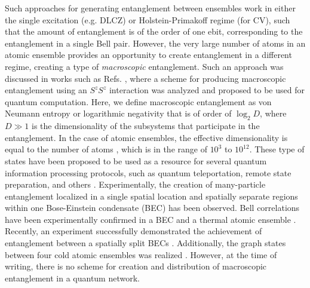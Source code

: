 \documentclass{WileyMSP-template}
\begin{document}
Such approaches for generating entanglement between ensembles work in either the single excitation  (e.g.  DLCZ) or Holstein-Primakoff regime (for CV), such that the amount of entanglement is of the order of one ebit, corresponding to the entanglement in a single Bell pair.  However, the very large number of atoms in an atomic ensemble provides an opportunity to create entanglement in a different regime, creating a type of {\it macroscopic} entanglement.
Such an approach was discussed in works such as Refs. \cite{byrnes2013fractality,pyrkov2013entanglement,rosseau2014,byrnes2012macroscopic,hussain2014geometric}, where a scheme for producing macroscopic entanglement using an $ S^z S^z$ interaction was analyzed and proposed to be used for quantum computation. Here, we define macroscopic entanglement as von Neumann entropy or logarithmic negativity that is of order of $ \log_2 D $, where $ D \gg 1  $ is the dimensionality of the subsystems that participate in the entanglement.  In the case of atomic ensembles, the effective dimensionality is equal to the number of atoms \cite{byrnes2020quantum}, which is in the range of $ 10^3 $ to $ 10^{12} $.   These type of states have been proposed to be used as a resource for several quantum information processing protocols, such as quantum teleportation, remote state preparation, and others \cite{pyrkov2014full,byrnes2015macroscopic,manish2021,byrnes2011accelerated}. Experimentally,
the creation of many-particle entanglement localized in a single spatial location \cite{schmied2016bell} and spatially separate regions \cite{fadel2018spatial} within one Bose-Einstein condensate (BEC) has been observed.
Bell correlations have been experimentally confirmed in a BEC \cite{schmied2016bell} and a thermal atomic ensemble \cite{engelsen2017}. Recently, an experiment successfully demonstrated the achievement of entanglement between a spatially split BECs \cite{Colciaghi2023}. Additionally, the graph states between four cold atomic ensembles was realized \cite{cooper24}. However, at the time of writing, there is no scheme for creation and distribution of macroscopic entanglement in a quantum network.
\end{document}
